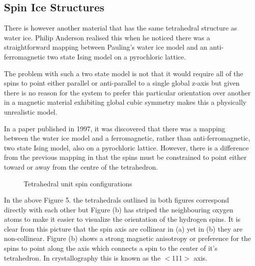 \subsection{Spin Ice Structures}
There is however another material that has the same tetrahedral structure as water ice.  Philip Anderson realised this when he noticed there was a straightforward mapping between Pauling's water ice model and an anti-ferromagnetic two state Ising model on a pyrochloric lattice.{\cite{b10}}
\par
The problem with such a two state model is not that it would require all of the spins to point either parallel or anti-parallel to a single global z-axis but given there is no reason for the system to prefer this particular orientation over another in a magnetic material exhibiting global cubic symmetry makes this a physically unrealistic model.
\par
In a paper published in 1997, it was discovered that there was a mapping between the water ice model and a ferromagnetic, rather than anti-ferromagnetic, two state Ising model, also on a pyrochloric lattice. However, there is a difference from the previous mapping in that the spins must be constrained to point either toward or away from the centre of the tetrahedron.
\par
\begin{figure}[ht!]
    \begin{center}
\qquad
        \caption[Tetrahedral unit spin configurations]{Tetrahedral unit spin configurations}
        \label{fig:gf4}
    \end{center}
\end{figure}
In the above Figure 5. the tetrahedrals outlined in both figures correspond directly with each other but Figure (b) has striped the neighbouring oxygen atoms to make it easier to visualize the orientation of the hydrogen spins. It is clear from this picture that the spin axis are collinear in (a) yet in (b) they are non-collinear.  Figure (b) shows a strong magnetic anisotropy or preference for the spins to point along the axis which connects a spin to the center of it's tetrahedron. In crystallography this is known as the $<$111$>$ axis.
\par
